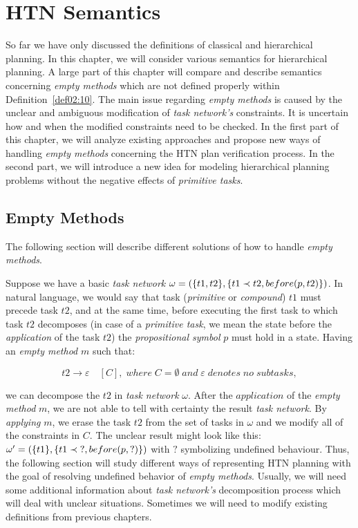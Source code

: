 \chapter{{HTN} Semantics}

\medskip\noindent
So far we have only discussed the definitions of classical and hierarchical planning. In this chapter, we will consider various semantics for hierarchical planning. A large part of this chapter will compare and describe semantics concerning \emph{empty methods} which are not defined properly within Definition~\ref{def02:10}. The main issue regarding \emph{empty methods} is caused by the unclear and ambiguous modification of \emph{task network's} constraints. It is uncertain how and when the modified constraints need to be checked. In the first part of this chapter, we will analyze existing approaches and propose new ways of handling \emph{empty methods} concerning the HTN plan verification process. In the second part, we will introduce a new idea for modeling hierarchical planning problems without the negative effects of \emph{primitive tasks}.

\section{Empty Methods}

\medskip\noindent
The following section will describe different solutions of how to handle \emph{empty methods}.

\begin{example}\label{ex03:5}
    Suppose we have a basic \emph{task network} $\omega = (\{t1, t2\}, \{t1 \prec t2, \\ before(p, t2)\})$. In natural language, we would say that task (\emph{primitive} or \emph{compound}) $t1$ must precede task $t2$, and at the same time, before executing the first task to which task $t2$ decomposes (in case of a \emph{primitive task}, we mean the state before the \emph{application} of the task $t2$) the \emph{propositional symbol} $p$ must hold in a state. Having an \emph{empty method} $m$ such that:
    
    \[
        t2 \rightarrow \varepsilon \quad [C], \; where \; C = \emptyset \; and \; \varepsilon \; denotes \; no \; subtasks,
    \]
    
    \noindent
    we can decompose the $t2$ in \emph{task network} $\omega$. After the $application$ of the \emph{empty method} $m$, we are not able to tell with certainty the result \emph{task network}. By \emph{applying} $m$, we erase the task $t2$ from the set of tasks in $\omega$ and we modify all of the constraints in $C$. The unclear result might look like this: $\omega' = (\{t1\}, \{t1 \prec \; ?, \\ before(p, ?)\})$ with $?$ symbolizing undefined behaviour. Thus, the following section will study different ways of representing HTN planning with the goal of resolving undefined behavior of \emph{empty methods}. Usually, we will need some additional information about \emph{task network's} decomposition process which will deal with unclear situations. Sometimes we will need to modify existing definitions from previous chapters.
\end{example}

